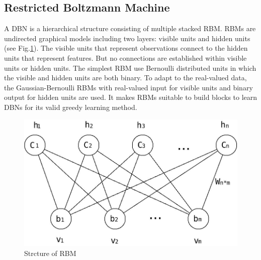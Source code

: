 \documentclass{llncs}
\begin{document}
\subsection{Restricted Boltzmann Machine}
%
A DBN is a hierarchical structure consisting of multiple stacked RBM. RBMs are undirected graphical models including two layers: visible units and hidden units (see Fig.\ref{fig:1}). The visible units that represent observations connect to the hidden units that represent features. But no connections are established within visible units or hidden units. The simplest RBM use Bernoulli distributed units in which the visible and hidden units are both binary. To adapt to the real-valued data, the Gaussian-Bernoulli RBMs with real-valued input for visible units and binary output for hidden units are used. It makes RBMs suitable to build blocks to learn DBNs for its valid greedy learning method.
\begin{figure}[!htbp]
	\centering 
		\includegraphics[scale=0.20]{figs/kdp1.jpeg}
    	\caption{Strcture of RBM} 
       	\label{fig:1}
\end{figure}
\end{document}
